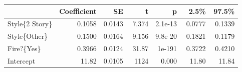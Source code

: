\begin{tabular}{lrrrrrr}
\toprule
{} &  Coefficient &     SE &      t &       p &    2.5\% &   97.5\% \\
\midrule
Style\{2 Story\} &       0.1058 & 0.0143 &  7.374 & 2.1e-13 &  0.0777 &  0.1339 \\
Style\{Other\}   &      -0.1500 & 0.0164 & -9.156 & 9.8e-20 & -0.1821 & -0.1179 \\
Fire?\{Yes\}     &       0.3966 & 0.0124 &  31.87 &  1e-191 &  0.3722 &  0.4210 \\
Intercept      &        11.82 & 0.0105 &   1124 &   0.000 &   11.80 &   11.84 \\
\bottomrule
\end{tabular}
